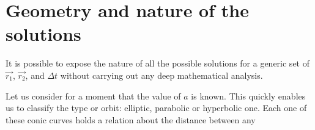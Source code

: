 \section{Geometry and nature of the solutions}

It is possible to expose the nature of all the possible solutions for a generic
set of $\vec{r_{1}}$, $\vec{r_{2}}$, and $\Delta t$ without carrying out any
deep mathematical analysis.

Let us consider for a moment that the value of $a$ is known. This quickly
enables us to classify the type or orbit: elliptic, parabolic or hyperbolic one.
Each one of these conic curves holds a relation about the distance between any


